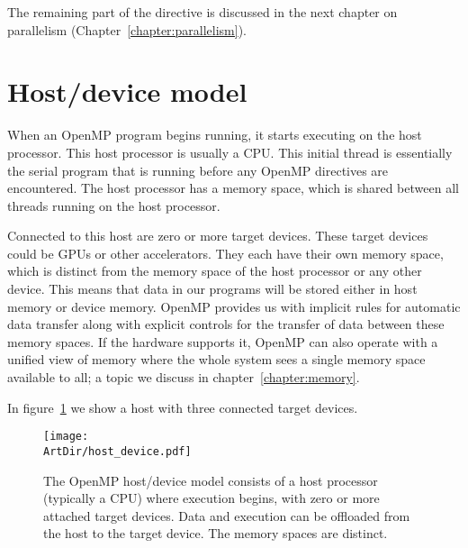The remaining part of the directive is discussed in the next chapter on parallelism (Chapter~\ref{chapter:parallelism}).


\section{Host/device model}
\label{sec:host_device_model}

When an OpenMP program begins running, it starts executing on the host processor.
This host processor is usually a CPU.
This initial thread is essentially the serial program that is running before any OpenMP directives are encountered.
The host processor has a memory space, which is shared between all threads running on the host processor.

Connected to this host are zero or more target devices. These target devices could be GPUs or other accelerators.
They each have their own memory space, which is distinct from the memory space of the host processor or any other device.
This means that data in our programs will be stored either in host memory or device memory.
OpenMP provides us with implicit rules for automatic data transfer along with explicit controls for the transfer of data between these memory spaces.
If the hardware supports it, OpenMP can also operate with a unified view of memory where the whole system sees a single memory space available to all; a topic we discuss in chapter~\ref{chapter:memory}.

In figure~\ref{fig:host_device} we show a host with three connected target devices.

\begin{figure}[t]
\label{fig:host_device}
\centerline{\texttt{[image: \\ArtDir/host\_device.pdf]}}
\caption[The OpenMP host/device model consits of a host processor (typically a CPU) where execution begins, with zero or more attached target devices.
Data and execution can be offloaded from the host to the target device.
The memory spaces are distinct.]
{The OpenMP host/device model consists of a host processor (typically a CPU) where execution begins, with zero or more attached target devices.
Data and execution can be offloaded from the host to the target device.
The memory spaces are distinct.}
\end{figure}


